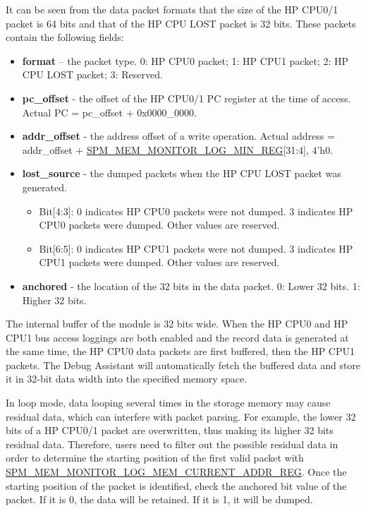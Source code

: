 \documentclass[main\_\_EN.tex]{subfiles}
\begin{document}
It can be seen from the data packet formats that the size of the HP CPU0/1 packet is 64 bits and that of the HP CPU LOST packet is 32 bits. These packets contain the following fields:

\begin{itemize}
    \item {\bfseries format} – the packet type. 0: HP CPU0 packet; 1: HP CPU1 packet; 2: HP CPU LOST packet; 3: Reserved.
    \item {\bfseries pc\_offset} - the offset of the HP CPU0/1 PC register at the time of access. Actual PC = pc\_offset + 0x0000\_0000.
    \item {\bfseries addr\_offset} - the address offset of a write operation. Actual address = addr\_offset + {\hyperref[regdesc:SPMMEMMONITORLOGMINREG]{SPM\_MEM\_MONITOR\_LOG\_MIN\_REG}[31:4], 4'h0}.
    \item {\bfseries lost\_source} - the dumped packets when the HP CPU LOST packet was generated.
    \begin{itemize}
        \item Bit[4:3]: 0 indicates HP CPU0 packets were not dumped. 3 indicates HP CPU0 packets were dumped. Other values are reserved.
        \item Bit[6:5]: 0 indicates HP CPU1 packets were not dumped. 3 indicates HP CPU1 packets were dumped. Other values are reserved.
    \end{itemize}
    \item {\bfseries anchored} - the location of the 32 bits in the data packet. 0: Lower 32 bits. 1: Higher 32 bits.
\end{itemize}

The internal buffer of the module is 32 bits wide. When the HP CPU0 and HP CPU1 bus access loggings are both enabled and the record data is generated at the same time, the HP CPU0 data packets are first buffered, then the HP CPU1 packets. The Debug Assistant will automatically fetch the buffered data and store it in 32-bit data width into the specified memory space.

In loop mode, data looping several times in the storage memory may cause residual data, which can interfere with packet parsing. For example, the lower 32 bits of a HP CPU0/1 packet are overwritten, thus making its higher 32 bits residual data. Therefore, users need to filter out the possible residual data in order to determine the starting position of the first valid packet with \hyperref[regdesc:SPMMEMMONITORLOGMEMCURRENTADDRREG]{SPM\_MEM\_MONITOR\_LOG\_MEM\_CURRENT\_ADDR\_REG}. Once the starting position of the packet is identified, check the anchored bit value of the packet. If it is 0, the data will be retained. If it is 1, it will be dumped.
\end{document}
